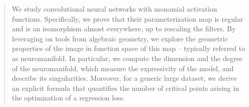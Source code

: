 \documentclass[twoside]{article}
\theoremstyle{plain}%
\theoremstyle{definition}
\theoremstyle{remark}
\begin{document}
%

%


\begin{abstract}
We study convolutional neural networks with monomial activation functions. Specifically, we prove that their parameterization map is regular and is an isomorphism almost everywhere, up to rescaling the filters. By leveraging on tools from algebraic geometry, we explore the geometric properties of the image in function space of this map -- typically referred to as neuromanifold. In particular, we compute the dimension and the degree of the neuromanifold, which measure the expressivity of the model, and describe its singularities. Moreover, for a generic large dataset, we derive an explicit formula that quantifies the number of critical points arising in the optimization of a regression loss.    



\end{abstract}
\end{document}
